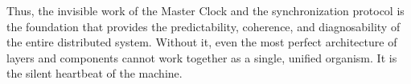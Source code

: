 Thus, the invisible work of the Master Clock and the synchronization protocol is the foundation that provides the predictability, coherence, and diagnosability of the entire distributed system. Without it, even the most perfect architecture of layers and components cannot work together as a single, unified organism. It is the silent heartbeat of the machine.



